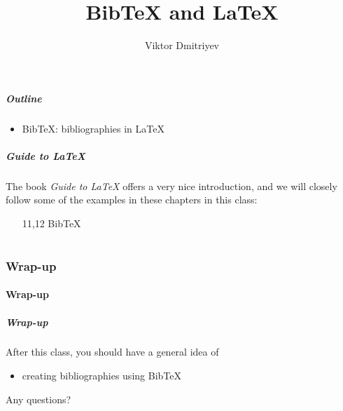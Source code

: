\documentclass[slidestop,compress,mathserif]{beamer}
\title{BibTeX and LaTeX}
\subtitle{}
\author{Viktor Dmitriyev}
\institute{Adapter from Mini Course on LaTeX by \href{https://github.com/OpenIntroOrg/mini-course-materials}{David Diez}}
\date{}
\begin{document}
\newenvironment{act}[1]{{\color{command}#1}}{}
\newcommand{\lcom}[1]{{\color{command}$\backslash$#1}}
\newcommand{\larg}[1]{{\color{braces}$\{${\color{black}#1}$\}$}}
\newcommand{\mathText}[1]{{\color{braces}\${\color{black}#1}\$}}


\frame{ \titlepage }

\begin{frame}
  \frametitle{Outline}
  \begin{itemize}
  \item BibTeX: bibliographies in LaTeX
  \end{itemize}
\end{frame}

\begin{frame}  \frametitle{Guide to LaTeX}
	The book \textit{Guide to LaTeX} offers a very nice introduction, and we will closely follow some of the examples in these chapters in this class:
	\begin{itemize}
	\item[11,12] BibTeX
	\end{itemize}
\end{frame}

\part{}



\section[Wrap-up]{Wrap-up}
\subsection[Wrap-up]{Wrap-up}

\begin{frame}  \frametitle{Wrap-up}
After this class, you should have a general idea of
\vspace{1mm} \\
\begin{itemize}
	\item creating bibliographies using BibTeX
\end{itemize}
\vspace{1mm}
Any questions?
\end{frame}
\end{document}
